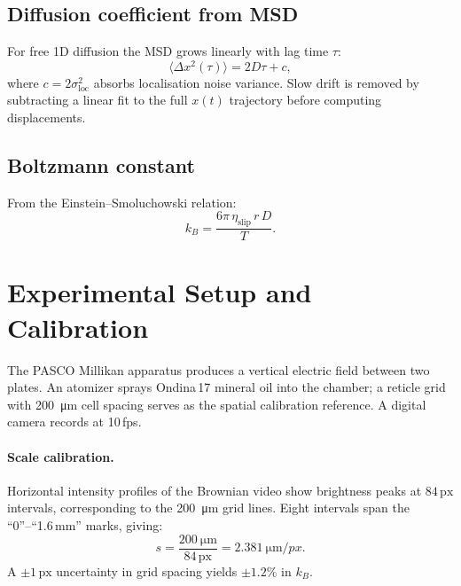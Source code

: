 \documentclass[12pt,a4paper]{article}
\begin{document}
\subsection{Diffusion coefficient from MSD}

For free 1D diffusion the MSD grows linearly with lag time $\tau$:
\begin{equation}
  \langle\Delta x^2(\tau)\rangle = 2D\tau + c,
  \label{eq:msd}
\end{equation}
where $c=2\sigma_\text{loc}^2$ absorbs localisation noise variance.
Slow drift is removed by subtracting a linear fit to the full $x(t)$
trajectory before computing displacements.

\subsection{Boltzmann constant}

From the Einstein--Smoluchowski relation:
\begin{equation}
  k_B = \frac{6\pi\,\eta_\text{slip}\,r\,D}{T}.
  \label{eq:kb}
\end{equation}

\section{Experimental Setup and Calibration}

The PASCO Millikan apparatus produces a vertical electric field between two
plates.  An atomizer sprays Ondina\,17 mineral oil into the chamber; a reticle
grid with \SI{200}{\micro\metre} cell spacing serves as the spatial calibration
reference.  A digital camera records at 10\,fps.

\paragraph{Scale calibration.}
Horizontal intensity profiles of the Brownian video show brightness peaks at
$84\,\text{px}$ intervals, corresponding to the \SI{200}{\micro\metre} grid
lines.  Eight intervals span the ``0''--``1.6\,mm'' marks, giving:
\[
  s = \frac{\SI{200}{\micro\metre}}{84\,\text{px}} = \SI{2.381}{\micro\metre/px}.
\]
A $\pm1\,\text{px}$ uncertainty in grid spacing yields $\pm1.2\%$ in $k_B$.
\end{document}
